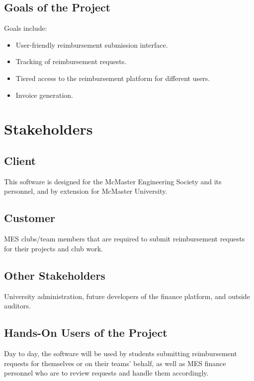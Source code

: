 \documentclass[12pt]{article}
\begin{document}
\subsection{Goals of the Project}
Goals include:
\begin{itemize}
    \item User-friendly reimbursement submission interface.
    \item Tracking of reimbursement requests.
    \item Tiered access to the reimbursement platform for different users.
    \item Invoice generation.
\end{itemize}

\section{Stakeholders}
\subsection{Client}
This software is designed for the McMaster Engineering Society and its personnel, and by extension for McMaster University.

\subsection{Customer}
MES clubs/team members that are required to submit reimbursement requests for their projects and club work.

\subsection{Other Stakeholders}
University administration, future developers of the finance platform, and outside auditors.

\subsection{Hands-On Users of the Project}
Day to day, the software will be used by students submitting reimbursement requests for themselves or on their teams' behalf, as well as MES finance personnel who are to review requests and handle them accordingly.
\end{document}
